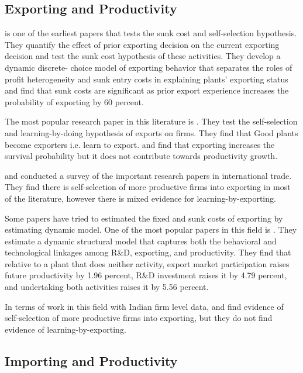 \documentclass[12pt]{article}
\begin{document}
\subsection*{Exporting and Productivity}

\textcite{roberts1997decision} is one of the earliest papers that
tests the sunk cost and self-selection hypothesis. They quantify the effect of prior exporting
decision on the current exporting decision and test the sunk cost
hypothesis of these activities.  They  develop a dynamic discrete-
 choice model of exporting behavior that separates the roles of profit heterogeneity
 and sunk entry costs in explaining plants' exporting status and find
 that sunk costs are significant as prior export experience increases
 the probability of exporting by 60 percent.  

The most popular research paper in this literature is
\textcite{bernard1999exceptional}. They test the self-selection and
 learning-by-doing hypothesis of exports on firms. They find that Good
 plants become exporters i.e. learn to export. and find that exporting
 increases the survival probability but it does not contribute towards
 productivity growth.  

\textcite{wagner2007exports} and \textcite{wagner2012international}
conducted a survey of the important research papers in international
trade. They find  there is self-selection of more productive
firms into exporting in most of the literature, however there is mixed evidence for
learning-by-exporting.  


Some papers have tried to estimated the fixed and sunk costs of
exporting by estimating dynamic model. One of the most popular papers
in this field is \textcite{aw2011}. They estimate a dynamic structural model that captures both the behavioral
and technological linkages among R\&D, exporting, and
productivity. They find that relative to a
plant that does neither activity, export market participation raises future productivity
by 1.96 percent, R\&D investment raises it by 4.79 percent, and undertaking both
activities raises it by 5.56 percent. 

In terms of work in this field with Indian firm level data,
\textcite{haidar2012trade} and \textcite{gupta2018exporting} find evidence of
self-selection of more productive firms into exporting, but they do
not find evidence of learning-by-exporting. 

\subsection*{Importing and Productivity}
\end{document}
